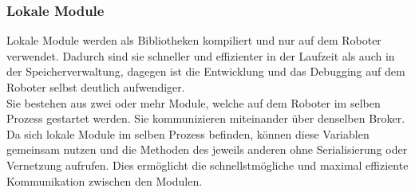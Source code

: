 \subsubsection{Lokale Module}\label{subsubsec:LokaleModule}
Lokale Module werden als Bibliotheken kompiliert und nur auf dem Roboter verwendet. Dadurch sind sie schneller und effizienter in der Laufzeit als auch in der Speicherverwaltung, dagegen ist die Entwicklung und das Debugging auf dem Roboter selbst deutlich aufwendiger.\\
Sie bestehen aus zwei oder mehr Module, welche auf dem Roboter im selben Prozess gestartet werden. Sie kommunizieren miteinander über denselben Broker.\\
Da sich lokale Module im selben Prozess befinden, können diese Variablen gemeinsam nutzen und die Methoden des jeweils anderen ohne Serialisierung oder Vernetzung aufrufen. Dies ermöglicht die schnellstmögliche und maximal effiziente Kommunikation zwischen den Modulen.\\

